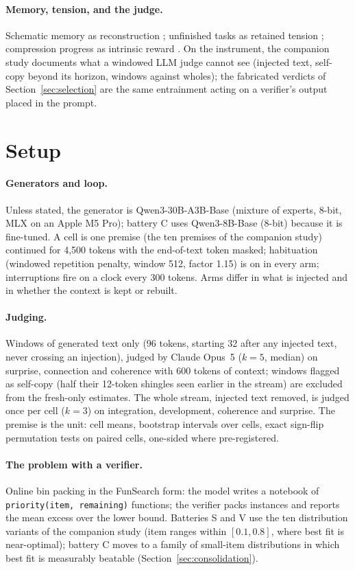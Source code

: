 \documentclass[11pt]{article}
\begin{document}
\paragraph{Memory, tension, and the judge.} Schematic memory as
reconstruction \citep{bartlett1932remembering}; unfinished tasks as
retained tension \citep{zeigarnik1927behalten}; compression progress as
intrinsic reward \citep{schmidhuber2010formal}. On the instrument, the
companion study documents what a windowed LLM judge cannot see (injected
text, self-copy beyond its horizon, windows against wholes); the fabricated
verdicts of Section~\ref{sec:selection} are the same entrainment acting on a
verifier's output placed in the prompt.

\section{Setup}
\label{sec:setup}

\paragraph{Generators and loop.} Unless stated, the generator is
Qwen3-30B-A3B-Base (mixture of experts, 8-bit, MLX on an Apple M5 Pro);
battery C uses Qwen3-8B-Base (8-bit) because it is fine-tuned. A cell is
one premise (the ten premises of the companion study) continued for 4,500
tokens with the end-of-text token masked; habituation (windowed repetition
penalty, window 512, factor 1.15) is on in every arm; interruptions fire on
a clock every 300 tokens. Arms differ in what is injected and in whether
the context is kept or rebuilt.

\paragraph{Judging.} Windows of generated text only (96 tokens, starting 32
after any injected text, never crossing an injection), judged by Claude
Opus~5 ($k=5$, median) on surprise, connection and coherence with 600 tokens
of context; windows flagged as self-copy (half their 12-token shingles seen
earlier in the stream) are excluded from the fresh-only estimates. The whole
stream, injected text removed, is judged once per cell ($k=3$) on
integration, development, coherence and surprise. The premise is the unit:
cell means, bootstrap intervals over cells, exact sign-flip permutation
tests on paired cells, one-sided where pre-registered.

\paragraph{The problem with a verifier.} Online bin packing in the
FunSearch form: the model writes a notebook of \texttt{priority(item,
remaining)} functions; the verifier packs instances and reports the mean
excess over the lower bound. Batteries S and V use the ten distribution
variants of the companion study (item ranges within $[0.1, 0.8]$, where
best fit is near-optimal); battery C moves to a family of small-item
distributions in which best fit is measurably beatable
(Section~\ref{sec:consolidation}).
\end{document}
